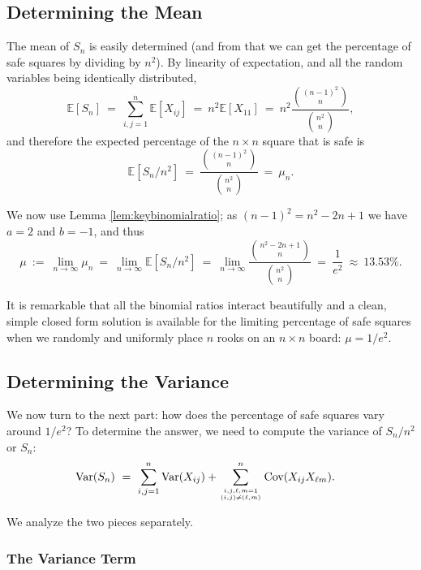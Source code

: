 \documentclass[12pt,reqno]{amsart}
\newcommand{\E}{\mathbb{E}}
\renewcommand{\E}{\mathbb{E}}
\numberwithin{equation}{section}
\theoremstyle{plain}
\newcommand\be{\begin{equation}}
\newcommand\ee{\end{equation}}
\newcommand{\ncr}[2]{{#1 \choose #2}}
\begin{document}
\subsection{Determining the Mean}

The mean of $S_n$ is easily determined (and from that we can get the percentage of safe squares by dividing by $n^2$). By linearity of expectation, and all the random variables being identically distributed,
\be \E[S_n]\ =\ \sum_{i,j=1}^n \E[X_{ij}] \ = \ n^2 \E[X_{11}] \ = \ n^2 \frac{\ncr{(n-1)^2}{n}}{\ncr{n^2}{n}}, \ee and therefore the expected percentage of the $n\times n$ square that is safe is \be \E[S_n / n^2] \ = \  \frac{\ncr{(n-1)^2}{n}}{\ncr{n^2}{n}} \ = \ \mu_n. \ee

We now use Lemma \ref{lem:keybinomialratio}; as $(n-1)^2 = n^2 - 2n + 1$ we have $a=2$ and $b=-1$, and thus \be \mu \ := \ \lim_{n\to\infty} \mu_n \ = \ \lim_{n\to\infty} \E[S_n / n^2] \ = \  \lim_{n\rightarrow \infty} \frac{\ncr{n^2-2n+1}{n}}{\ncr{n^2}{n}}\ =\ \frac{1}{e^2} \ \approx \ 13.53\%. \ee

It is remarkable that all the binomial ratios interact beautifully and a clean, simple closed form solution is available for the limiting percentage of safe squares when we randomly and uniformly place $n$ rooks on an $n\times n$ board: $\mu = 1/e^2$.


\subsection{Determining the Variance}

We now turn to the next part: how does the percentage of safe squares vary around $1/e^2$? To determine the answer, we need to compute the variance of $S_n/n^2$ or $S_n$:
\begin{align}\label{eq:varcovarexpansion}
    \text{Var}(S_n) &\ = \  \sum_{i,j = 1}^n \text{Var}(X_{ij}) + \sum_{i,j,\ell,m=1 \atop (i,j) \neq (\ell,m)}^n\text{Cov}(X_{ij}X_{\ell m}).
\end{align}

We analyze the two pieces separately. 

\subsubsection{The Variance Term}
\end{document}
